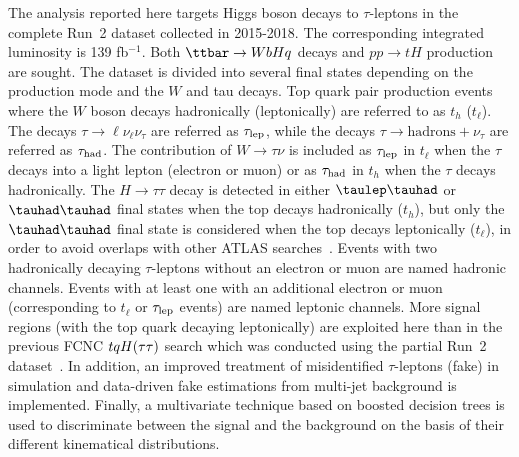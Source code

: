 
The analysis reported here targets Higgs boson decays to 
$\tau$-leptons in the complete Run~2 dataset collected in 2015-2018. The corresponding integrated luminosity is 139 fb$^{-1}$. Both $\ttbar \to WbHq$ decays and $pp \to tH$ production are sought. The dataset is divided into several final states depending on the production mode and
the  $W$ and tau decays. Top quark pair production events where the $W$ boson decays hadronically (leptonically) are referred to as $t_h$ ($t_{\ell}$).
The decays $\tau \to \ell \nu_{\ell} \nu_{\tau}$ are referred as $\tau_{\mathrm{lep}}$, while the decays $\tau \to \text{hadrons} + \nu_{\tau}$ are referred as $\tau_\text{had}$.
The contribution of 
$W\rightarrow\tau\nu$ is included as $\tau_{\mathrm{lep}}$ in $t_{\ell}$ when the $\tau$ decays into a light lepton (electron or muon) or as $\tau_\text{had}$ 
in $t_h$ when the $\tau$ decays hadronically.
The $H\rightarrow \tau\tau$ decay is detected in
either $\tlhad$ or $\thadhad$ final states when the top decays hadronically ($t_h$), but only the $\thadhad$ final state is considered
when the top decays leptonically ($t_{\ell}$), in order to avoid overlaps with
other ATLAS searches~\cite{Aaboud:2018pob}. 
Events with two hadronically decaying $\tau$-leptons without an electron or muon are named hadronic channels. Events with at least one \tauhad with an additional electron or muon (corresponding to $t_{\ell}$ or $\tau_{\mathrm{lep}}$ events) are named leptonic channels. More signal regions (with the top quark decaying leptonically) are exploited here than in the previous FCNC $tqH(\tau\tau)$ search which was conducted using the partial Run~2 dataset~\cite{fcnc36}.
In addition, an improved treatment of misidentified $\tau$-leptons (fake) in simulation and data-driven
fake estimations from multi-jet background is implemented.
Finally, a multivariate technique based on boosted decision trees is used to discriminate between the signal and the background on the basis of their different kinematical distributions. 

